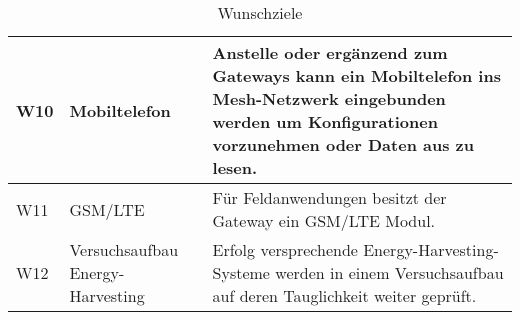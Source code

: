 \begin{table}[H]
\begin{tabular}{ | C{0.9cm} | p{3.3cm} | p{10cm} |}
W10 & Mobiltelefon & Anstelle oder ergänzend zum Gateways kann ein Mobiltelefon ins Mesh-Netzwerk eingebunden werden um Konfigurationen vorzunehmen oder Daten aus zu lesen. \\ \hline

W11 & GSM/LTE & Für Feldanwendungen besitzt der Gateway ein GSM/LTE Modul. \\ \hline

W12 & Versuchsaufbau Energy-Harvesting & Erfolg versprechende Energy-Harvesting-Systeme werden in einem Versuchsaufbau auf deren Tauglichkeit weiter geprüft. \\ \hline


\end{tabular}\\
\caption{Wunschziele}
\label{tab:Wunschziele}
\end{table}

















